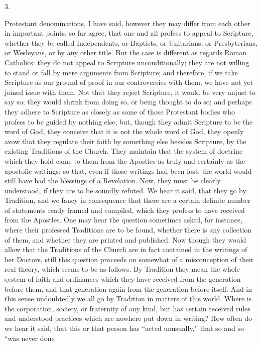 3.

Protestant denominations, I have said, however they may differ from
each other in important points, so far agree, that one and all profess
to appeal to Scripture, whether they be called Independents, or
Baptists, or Unitarians, or Presbyterians, or Wesleyans, or by any
other title. But the case is different as regards Roman Catholics:
they do not appeal to Scripture unconditionally; they are not willing
to stand or fall by mere arguments from Scripture; and therefore, if
we take Scripture as our ground of proof in our controversies with
them, we have not yet joined issue with them. Not that they reject
Scripture, it would be very unjust to say so; they would shrink from
doing so, or being thought to do so; and perhaps they adhere to
Scripture as closely as some of those Protestant bodies who profess to
be guided by nothing else; but, though they admit Scripture to be
the word of God, they conceive that it is not the whole word of God,
they openly avow that they regulate their faith by something else
besides Scripture, by the existing Traditions of the Church. They
maintain that the system of doctrine which they hold came to them from
the Apostles as truly and certainly as the apostolic writings; so
that, even if those writings had been lost, the world would still have
had the blessings of a Revelation. Now, they must be clearly
understood, if they are to be soundly refuted. We hear it said, that
they go by Tradition, and we fancy in consequence that there are a
certain definite number of statements ready framed and compiled, which
they profess to have received from the Apostles. One may hear the
question sometimes asked, for instance, where their professed
Traditions are to be found, whether there is any collection of them,
and whether they are printed and published. Now though they would
allow that the Traditions of the Church are in fact contained in the
writings of her Doctors, still this question proceeds on somewhat of a
misconception of their real theory, which seems to be as follows. By
Tradition they mean the whole system of faith and ordinances which
they have received from the generation before them, and that
generation again from the generation before itself. And in this sense
undoubtedly we all go by Tradition in matters of this world. Where is
the corporation, society, or fraternity of any kind, but has certain
received rules and understood practices which are nowhere put down in
writing? How often do we hear it said, that this or that person has
``acted unusually,'' that so and so ``was never done
